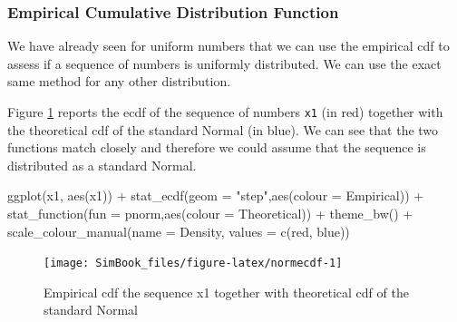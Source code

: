 \documentclass[
]{book}
\newenvironment{Shaded}{\begin{snugshade}}{\end{snugshade}}
\newcommand{\AttributeTok}[1]{\textcolor[rgb]{0.77,0.63,0.00}{#1}}
\newcommand{\FunctionTok}[1]{\textcolor[rgb]{0.00,0.00,0.00}{#1}}
\newcommand{\NormalTok}[1]{#1}
\newcommand{\SpecialCharTok}[1]{\textcolor[rgb]{0.00,0.00,0.00}{#1}}
\newcommand{\StringTok}[1]{\textcolor[rgb]{0.31,0.60,0.02}{#1}}
\begin{document}
\hypertarget{empirical-cumulative-distribution-function}{%
\subsubsection{Empirical Cumulative Distribution Function}\label{empirical-cumulative-distribution-function}}

We have already seen for uniform numbers that we can use the empirical cdf to assess if a sequence of numbers is uniformly distributed. We can use the exact same method for any other distribution.

Figure \ref{fig:normecdf} reports the ecdf of the sequence of numbers \texttt{x1} (in red) together with the theoretical cdf of the standard Normal (in blue). We can see that the two functions match closely and therefore we could assume that the sequence is distributed as a standard Normal.

\begin{Shaded}
\begin{Highlighting}[]
\FunctionTok{ggplot}\NormalTok{(x1, }\FunctionTok{aes}\NormalTok{(x1)) }\SpecialCharTok{+}
   \FunctionTok{stat\_ecdf}\NormalTok{(}\AttributeTok{geom =} \StringTok{"step"}\NormalTok{,}\FunctionTok{aes}\NormalTok{(}\AttributeTok{colour =} \StringTok{\textquotesingle{}Empirical\textquotesingle{}}\NormalTok{)) }\SpecialCharTok{+}
   \FunctionTok{stat\_function}\NormalTok{(}\AttributeTok{fun =}\NormalTok{ pnorm,}\FunctionTok{aes}\NormalTok{(}\AttributeTok{colour =} \StringTok{\textquotesingle{}Theoretical\textquotesingle{}}\NormalTok{)) }\SpecialCharTok{+}
   \FunctionTok{theme\_bw}\NormalTok{() }\SpecialCharTok{+}      
   \FunctionTok{scale\_colour\_manual}\NormalTok{(}\AttributeTok{name =} \StringTok{\textquotesingle{}Density\textquotesingle{}}\NormalTok{, }\AttributeTok{values =} \FunctionTok{c}\NormalTok{(}\StringTok{\textquotesingle{}red\textquotesingle{}}\NormalTok{, }\StringTok{\textquotesingle{}blue\textquotesingle{}}\NormalTok{))}
\end{Highlighting}
\end{Shaded}

\begin{figure}

{\centering \texttt{[image: SimBook\_files/figure-latex/normecdf-1]} 

}

\caption{Empirical cdf the sequence x1 together with theoretical cdf of the standard Normal}\label{fig:normecdf}
\end{figure}
\end{document}
